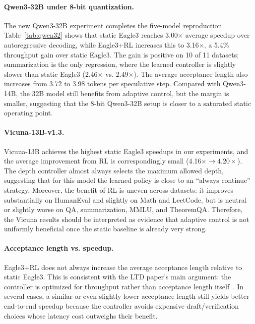 \documentclass[letterpaper,twocolumn,10pt]{article}
\begin{document}
\paragraph{Qwen3-32B under 8-bit quantization.}
The new Qwen3-32B experiment completes the five-model reproduction. Table~\ref{tab:qwen32} shows that static Eagle3 reaches 3.00$\times$ average speedup over autoregressive decoding, while Eagle3+RL increases this to 3.16$\times$, a 5.4\% throughput gain over static Eagle3. The gain is positive on 10 of 11 datasets; summarization is the only regression, where the learned controller is slightly slower than static Eagle3 (2.46$\times$ vs. 2.49$\times$). The average acceptance length also increases from 3.72 to 3.98 tokens per speculative step. Compared with Qwen3-14B, the 32B model still benefits from adaptive control, but the margin is smaller, suggesting that the 8-bit Qwen3-32B setup is closer to a saturated static operating point.

\paragraph{Vicuna-13B-v1.3.}
Vicuna-13B achieves the highest static Eagle3 speedups in our experiments, and the average improvement from RL is correspondingly small (4.16$\times \to 4.20\times$). The depth controller almost always selects the maximum allowed depth, suggesting that for this model the learned policy is close to an ``always continue'' strategy. Moreover, the benefit of RL is uneven across datasets: it improves substantially on HumanEval and slightly on Math and LeetCode, but is neutral or slightly worse on QA, summarization, MMLU, and TheoremQA. Therefore, the Vicuna results should be interpreted as evidence that adaptive control is not uniformly beneficial once the static baseline is already very strong.

\paragraph{Acceptance length vs. speedup.}
Eagle3+RL does not always increase the average acceptance length relative to static Eagle3. This is consistent with the LTD paper's main argument: the controller is optimized for throughput rather than acceptance length itself~\cite{ltd2025}. In several cases, a similar or even slightly lower acceptance length still yields better end-to-end speedup because the controller avoids expensive draft/verification choices whose latency cost outweighs their benefit.
\end{document}
